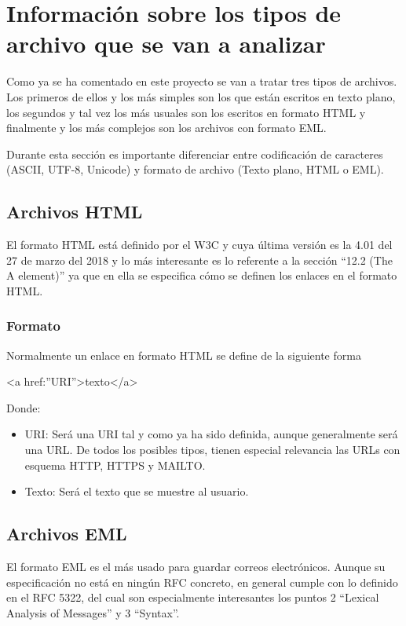 \section{Información sobre los tipos de archivo que se van a analizar}
Como ya se ha comentado en este proyecto se van a tratar tres tipos de archivos. Los primeros de ellos y los más simples son los que están escritos en texto plano, los segundos y tal vez los más usuales son los escritos en formato HTML y finalmente y los más complejos son los archivos con formato EML.

Durante esta sección es importante diferenciar entre codificación de caracteres (ASCII, UTF-8, Unicode) y formato de archivo (Texto plano, HTML o EML).

\subsection{Archivos HTML}
El formato HTML está definido por el W3C y cuya última versión es la 4.01 del 27 de marzo del 2018 y lo más interesante es lo referente a la sección “12.2 (The A element)” \cite{html_a_tag} ya que en ella se especifica cómo se definen los enlaces en el formato HTML. 

\subsubsection{Formato}
Normalmente un enlace en formato HTML se define de la siguiente forma

<a href:”{URI}”>{texto}</a>

Donde: 

\begin{itemize}
    \item URI: Será una URI tal y como ya ha sido definida, aunque generalmente será una URL. De todos los posibles tipos, tienen especial relevancia las URLs con esquema HTTP, HTTPS y MAILTO.
    \item Texto: Será el texto que se muestre al usuario.
\end{itemize}

\subsection{Archivos EML}
El formato EML es el más usado para guardar correos electrónicos. Aunque su especificación no está en ningún RFC concreto, en general cumple con lo definido en el RFC 5322\cite{rfc5322}, del cual son especialmente interesantes los puntos 2 “Lexical Analysis of Messages” y 3 “Syntax”. 

